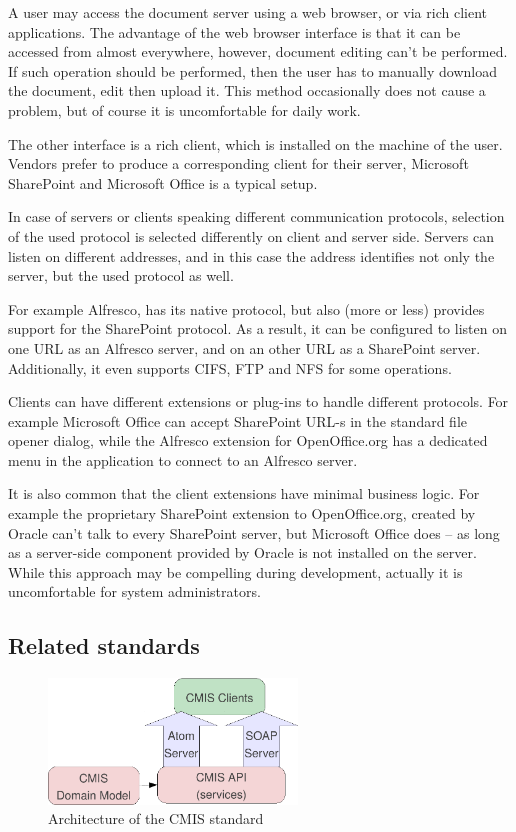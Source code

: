 A user may access the document server using a web browser, or via rich client
applications. The advantage of the web browser interface is that it can be
accessed from almost everywhere, however, document editing can't be performed.
If such operation should be performed, then the user has to manually download
the document, edit then upload it. This method occasionally does not cause a
problem, but of course it is uncomfortable for daily work.

The other interface is a rich client, which is installed on the machine of the
user. Vendors prefer to produce a corresponding client for their server,
Microsoft SharePoint and Microsoft Office is a typical setup.

In case of servers or clients speaking different communication protocols,
selection of the used protocol is selected differently on client and server
side. Servers can listen on different addresses, and in this case the address
identifies not only the server, but the used protocol as well.

For example Alfresco, has its native protocol, but also (more or less) provides
support for the SharePoint protocol. As a result, it can be configured to
listen on one URL as an Alfresco server, and on an other URL as a SharePoint
server. Additionally, it even supports CIFS, FTP and NFS for some
operations. \cite{alfresco-fsc}

Clients can have different extensions or plug-ins to handle different
protocols. For example Microsoft Office can accept SharePoint URL-s in the
standard file opener dialog, while the Alfresco extension for OpenOffice.org
has a dedicated menu in the application to connect to an Alfresco server.

It is also common that the client extensions have minimal business logic. For
example the proprietary SharePoint extension to OpenOffice.org, created by
Oracle can't talk to every SharePoint server, but Microsoft Office does -- as
long as a server-side component provided by Oracle is not installed on the
server. While this approach may be compelling during development, actually it
is uncomfortable for system administrators.

\subsection{Related standards}

\begin{figure}[H]
\centering
\includegraphics[width=250px,keepaspectratio]{cmis.pdf}
\caption{Architecture of the CMIS standard}
\label{fig:cmis}
\end{figure}

